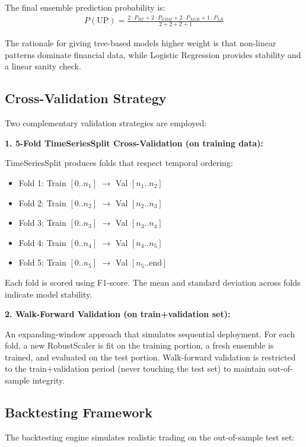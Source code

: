 \documentclass[12pt, a4paper]{report}
\begin{document}
	The final ensemble prediction probability is:
	\begin{align}
		P(\text{UP}) = \frac{2 \cdot P_{RF} + 2 \cdot P_{GBM} + 2 \cdot P_{XGB} + 1 \cdot P_{LR}}{2 + 2 + 2 + 1}
	\end{align}
	
	The rationale for giving tree-based models higher weight is that non-linear patterns dominate financial data, while Logistic Regression provides stability and a linear sanity check.
	
	\subsection{Cross-Validation Strategy}
	Two complementary validation strategies are employed:
	
	\textbf{1. 5-Fold TimeSeriesSplit Cross-Validation (on training data):}
	
	TimeSeriesSplit produces folds that respect temporal ordering:
	\vspace{-18pt}
	\begin{itemize}
		\item Fold 1: Train $[0..n_1]$ $\rightarrow$ Val $[n_1..n_2]$
		\item Fold 2: Train $[0..n_2]$ $\rightarrow$ Val $[n_2..n_3]$
		\item Fold 3: Train $[0..n_3]$ $\rightarrow$ Val $[n_3..n_4]$
		\item Fold 4: Train $[0..n_4]$ $\rightarrow$ Val $[n_4..n_5]$
		\item Fold 5: Train $[0..n_5]$ $\rightarrow$ Val $[n_5..\text{end}]$
	\end{itemize}
	Each fold is scored using F1-score. The mean and standard deviation across folds indicate model stability.
	
	\textbf{2. Walk-Forward Validation (on train+validation set):}
	
	An expanding-window approach that simulates sequential deployment. For each fold, a new RobustScaler is fit on the training portion, a fresh ensemble is trained, and evaluated on the test portion. Walk-forward validation is restricted to the train+validation period (never touching the test set) to maintain out-of-sample integrity.
	
	\subsection{Backtesting Framework}
	The backtesting engine simulates realistic trading on the out-of-sample test set:
	
\end{document}
